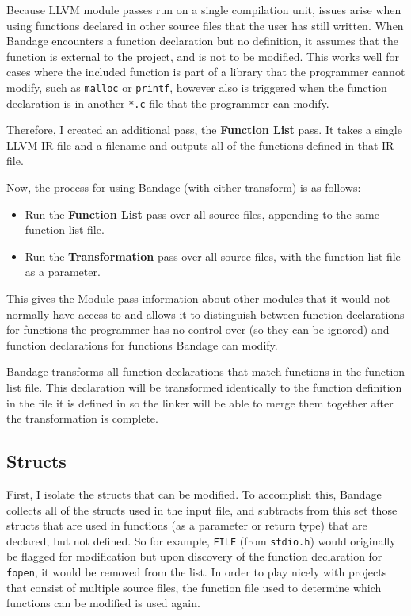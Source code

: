 Because LLVM module passes run on a single compilation unit, issues arise when using functions declared in other source files that the user has still written.
When Bandage encounters a function declaration but no definition, it assumes that the function is external to the project, and is not to be modified.
This works well for cases where the included function is part of a library that the programmer cannot modify, such as \verb!malloc! or \verb!printf!, however also is triggered when the function declaration is in another \verb!*.c! file that the programmer can modify.

Therefore, I created an additional pass, the \textbf{Function List} pass.
It takes a single LLVM IR file and a filename and outputs all of the functions defined in that IR file.

Now, the process for using Bandage (with either transform) is as follows:
\begin{itemize}
\item Run the \textbf{Function List} pass over all source files, appending to the same function list file.
\item Run the \textbf{Transformation} pass over all source files, with the function list file as a parameter.
\end{itemize}

This gives the Module pass information about other modules that it would not normally have access to and allows it to distinguish between function declarations for functions the programmer has no control over (so they can be ignored) and function declarations for functions Bandage can modify.

Bandage transforms all function declarations that match functions in the function list file.
This declaration will be transformed identically to the function definition in the file it is defined in so the linker will be able to merge them together after the transformation is complete.


\subsection{Structs}

First, I isolate the structs that can be modified.
To accomplish this, Bandage collects all of the structs used in the input file, and subtracts from this set those structs that are used in functions (as a parameter or return type) that are declared, but not defined.
So for example, \verb!FILE! (from \verb!stdio.h!) would originally be flagged for modification but upon discovery of the function declaration for \verb!fopen!, it would be removed from the list.
In order to play nicely with projects that consist of multiple source files, the function file used to determine which functions can be modified is used again.

